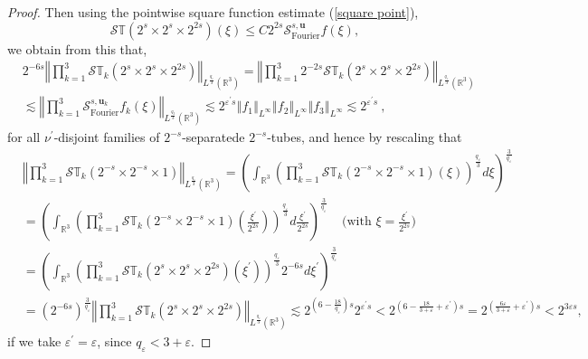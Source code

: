 \documentclass[10pt,a4paper]{amsart}
\begin{document}
\begin{proof}
Then using the pointwise square function estimate (\ref{square point}),
\[
\mathcal{S}\mathbb{T}\left(  2^{s}\times2^{s}\times2^{2s}\right)  \left(
\xi\right)  \leq C2^{2s}\mathcal{S}_{\operatorname*{Fourier}}^{s,\mathbf{u}%
}f\left(  \xi\right)  ,
\]
we obtain from this that,%
\begin{align*}
&  2^{-6s}\left\Vert \prod_{k=1}^{3}\mathcal{S}\mathbb{T}_{k}\left(
2^{s}\times2^{s}\times2^{2s}\right)  \right\Vert _{L^{\frac{q_{\varepsilon}%
}{3}}\left(  \mathbb{R}^{3}\right)  }=\left\Vert \prod_{k=1}^{3}%
2^{-2s}\mathcal{S}\mathbb{T}_{k}\left(  2^{s}\times2^{s}\times2^{2s}\right)
\right\Vert _{L^{\frac{q_{\varepsilon}}{3}}\left(  \mathbb{R}^{3}\right)  }\\
&  \lesssim\left\Vert \prod_{k=1}^{3}\mathcal{S}_{\operatorname*{Fourier}%
}^{s,\mathbf{u}_{k}}f_{k}\left(  \xi\right)  \right\Vert _{L^{\frac{q_{3}}{3}%
}\left(  \mathbb{R}^{3}\right)  }\lesssim2^{\varepsilon^{\prime}s}\left\Vert
f_{1}\right\Vert _{L^{\infty}}\left\Vert f_{2}\right\Vert _{L^{\infty}%
}\left\Vert f_{3}\right\Vert _{L^{\infty}}\lesssim2^{\varepsilon^{\prime}s}\ ,
\end{align*}
for all $\nu^{\prime}$-disjoint families of $2^{-s}$-separatede $2^{-s}%
$-tubes, and hence by rescaling that%
\begin{align*}
&  \left\Vert \prod_{k=1}^{3}\mathcal{S}\mathbb{T}_{k}\left(  2^{-s}%
\times2^{-s}\times1\right)  \right\Vert _{L^{\frac{q_{\varepsilon}}{3}}\left(
\mathbb{R}^{3}\right)  }=\left(  \int_{\mathbb{R}^{3}}\left(  \prod_{k=1}%
^{3}\mathcal{S}\mathbb{T}_{k}\left(  2^{-s}\times2^{-s}\times1\right)  \left(
\xi\right)  \right)  ^{\frac{q_{\varepsilon}}{3}}d\xi\right)  ^{\frac
{3}{q_{\varepsilon}}}\\
&  =\left(  \int_{\mathbb{R}^{3}}\left(  \prod_{k=1}^{3}\mathcal{S}%
\mathbb{T}_{k}\left(  2^{-s}\times2^{-s}\times1\right)  \left(  \frac
{\xi^{\prime}}{2^{2s}}\right)  \right)  ^{\frac{q_{\varepsilon}}{3}}d\frac
{\xi^{\prime}}{2^{2s}}\right)  ^{\frac{3}{q_{\varepsilon}}}%
\ \ \ \ \ \text{(with }\xi=\frac{\xi^{\prime}}{2^{2s}}\text{)}\\
&  =\left(  \int_{\mathbb{R}^{3}}\left(  \prod_{k=1}^{3}\mathcal{S}%
\mathbb{T}_{k}\left(  2^{s}\times2^{s}\times2^{2s}\right)  \left(  \xi
^{\prime}\right)  \right)  ^{\frac{q_{\varepsilon}}{3}}2^{-6s}d\xi^{\prime
}\right)  ^{\frac{3}{q_{\varepsilon}}}\\
&  =\left(  2^{-6s}\right)  ^{\frac{3}{q_{\varepsilon}}}\left\Vert \prod
_{k=1}^{3}\mathcal{S}\mathbb{T}_{k}\left(  2^{s}\times2^{s}\times
2^{2s}\right)  \right\Vert _{L^{\frac{q_{\varepsilon}}{3}}\left(
\mathbb{R}^{3}\right)  }\lesssim2^{\left(  6-\frac{18}{q_{\varepsilon}%
}\right)  s}2^{\varepsilon^{\prime}s}<2^{\left(  6-\frac{18}{3+\varepsilon
}+\varepsilon^{\prime}\right)  s}=2^{\left(  \frac{6\varepsilon}%
{3+\varepsilon}+\varepsilon^{\prime}\right)  s}<2^{3\varepsilon s},
\end{align*}
if we take $\varepsilon^{\prime}=\varepsilon$, since $q_{\varepsilon
}<3+\varepsilon$.


\end{proof}
\end{document}
